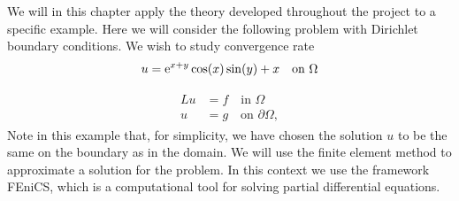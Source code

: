 
We will in this chapter apply the theory developed throughout the project to a specific example. 
Here we will consider the following problem with Dirichlet boundary conditions.
We wish to study convergence rate 
\begin{equation}
    u = \text{e}^{x+y}\cos(x)\sin(y)+x  \quad\text{on }\Omega \label{eq:app_dirichlet}
\end{equation}



\begin{align}
\begin{split}
    Lu &= f \quad \text{in } \Omega \\
    u &= g \quad \text{on } \partial \Omega,
\end{split}
\end{align}
Note in this example that, for simplicity, we have chosen the solution $u$ to be the same on the boundary as in the domain.
We will use the finite element method to approximate a solution for the problem. In this context we use the framework FEniCS,
which is a computational tool for solving partial differential equations. 